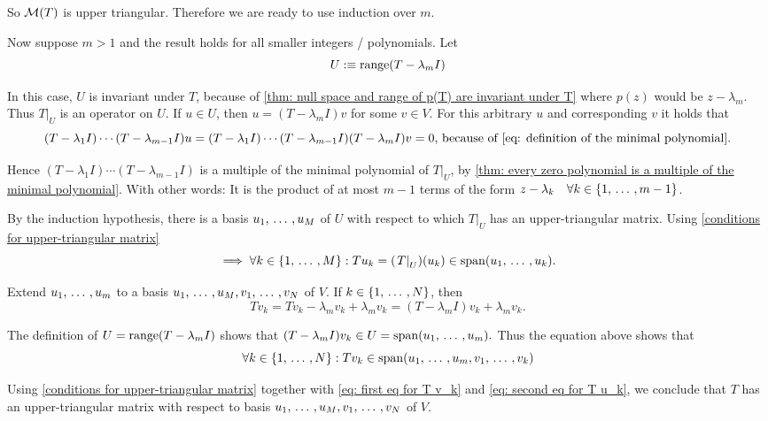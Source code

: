 \begin{prf}
  So $\mathcal{M}(T)$ is upper triangular. Therefore we are ready to use induction over $m$.

  Now suppose $m > 1$ and the result holds for all smaller integers /  polynomials. Let
  \begin{equation}
    U :\equiv \operatorname{range}(T - \lambda_m I)
  \end{equation}

  In this case, $U$ is invariant under $T$, because of \ref{thm: null space and range of p(T) are invariant under T} where $p(z)$ would be $z-\lambda_m$. Thus $\left. T \right |_{U}$ is an operator on $U$.
  If $u \in U$, then $u=(T - \lambda_m I) v$ for some $v \in V$. For this arbitrary $u$ and corresponding $v$ it holds that
  \begin{equation}
    (T-\lambda_1 I) \cdots (T-\lambda_{m-1}I)u=(T-\lambda_1I)\cdots(T-\lambda_{m-1}I)(T-\lambda_mI)v=0, $ because of \eqref{eq: definition of the minimal polynomial}.$
  \end{equation}

  Hence $(T-\lambda_1 I) \cdots (T-\lambda_{m-1}I)$ is a multiple of the minimal polynomial of $\left. T \right |_{U}$, by \ref{thm: every zero polynomial is a multiple of the minimal polynomial}. With other words: It is the product of at most $m-1$ terms of the form $z-\lambda_k \quad \forall k \in \{1, {\, \ldots \,\,}, m-1 \}$.

  By the induction hypothesis, there is a basis $u_1, {\, \ldots \,\,}, u_M$ of $U$ with respect to which $\left. T \right |_{U}$ has an upper-triangular matrix. Using \ref{conditions for upper-triangular matrix}
  \begin{equation}
    \label{eq: first eq for T v_k}
    \implies \forall k \in \{ 1, {\, \ldots \,\,}, M \}:
    T u_k = ( \left. T \right|_{U})(u_k)
    \in \operatorname{span} (u_1, {\, \ldots \,\,}, u_k).
  \end{equation}

  Extend $u_1, {\, \ldots \,\,}, u_m$ to a basis $u_1, {\, \ldots \,\,}, u_M, v_1, {\, \ldots \,\,}, v_N$ of $V$. If $k \in \{1, {\, \ldots \,\,}, N\}$, then
  \begin{equation}
    T v_k = T v_k - \lambda_m v_k + \lambda_m v_k = (T-\lambda_m I)v_k + \lambda_m v_k.
  \end{equation}

  The definition of $U=\operatorname{range}(T-\lambda_mI)$ shows that $(T-\lambda_mI) v_k \in U = \operatorname{span} (u_1, {\, \ldots \,\,}, u_m).$ Thus the equation above shows that
  \begin{equation}
    \label{eq: second eq for T u_k}
    \forall k \in \{ 1, {\, \ldots \,\,}, N \}: T v_k \in \operatorname{span} (u_1, {\, \ldots \,\,}, u_m, v_1, {\, \ldots \,\,}, v_k)
  \end{equation}

  Using \ref{conditions for upper-triangular matrix} together with \eqref{eq: first eq for T v_k} and \eqref{eq: second eq for T u_k}, we conclude that $T$ has an upper-triangular matrix with respect to basis $u_1, {\, \ldots \,\,}, u_M, v_1, {\, \ldots \,\,}, v_N$ of $V$.
\end{prf}


